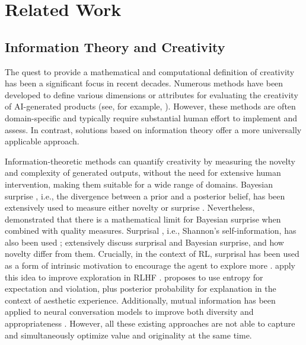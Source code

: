 \section{Related Work}
\label{related_work}

\subsection{Information Theory and Creativity}

The quest to provide a mathematical and computational definition of creativity has been a significant focus in recent decades. Numerous methods have been developed to define various dimensions or attributes for evaluating the creativity of AI-generated products (see, for example, \citealp{franceschelli2024creativity}). However, these methods are often domain-specific and typically require substantial human effort to implement and assess. In contrast, solutions based on information theory \cite{shannon1948mathematical, cover1999elements} offer a more universally applicable approach. 

Information-theoretic methods can quantify creativity by measuring the novelty and complexity of generated outputs,
without the need for extensive human intervention, making them suitable for a wide range of domains. 
Bayesian surprise \cite{baldi2010bits}, i.e., the divergence between a prior and a posterior belief, has been extensively used to measure either novelty \cite{franca2016regent,varshney2019big} or surprise \cite{mazzaglia2022curiosity,schmidhuber2010formal}. Nevertheless, \citet{varshney2019mathematical} demonstrated that there is a mathematical limit for Bayesian surprise when combined with quality measures. Surprisal \cite{tribus1961thermodynamics}, i.e., Shannon's self-information, has also been used \cite{bunescu2019learning,fernandezmonsalve2012lexical}; \citet{barto2013novelty} extensively discuss surprisal and Bayesian surprise, and how novelty differ from them. Crucially, in the context of RL, surprisal has been used as a form of intrinsic motivation to encourage the agent to explore more \cite{achiam2017surprise}. \citet{sun2025curiosity} apply this idea to improve exploration in RLHF \cite{christiano2017deep}.
\citet{burns2006atoms} proposes to use entropy for expectation and violation, plus posterior probability for explanation in the context of aesthetic experience. Additionally, mutual information has been applied to neural conversation models to improve both diversity and appropriateness \cite{li2016diversity}. 
However, all these existing approaches are not able to capture and simultaneously optimize value and originality at the same time.

